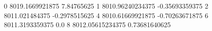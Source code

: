 0 8019.1669921875 7.84765625
1 8010.96240234375 -0.35693359375
2 8011.021484375 -0.2978515625
4 8010.61669921875 -0.70263671875
6 8011.3193359375 0.0
8 8012.05615234375 0.73681640625
